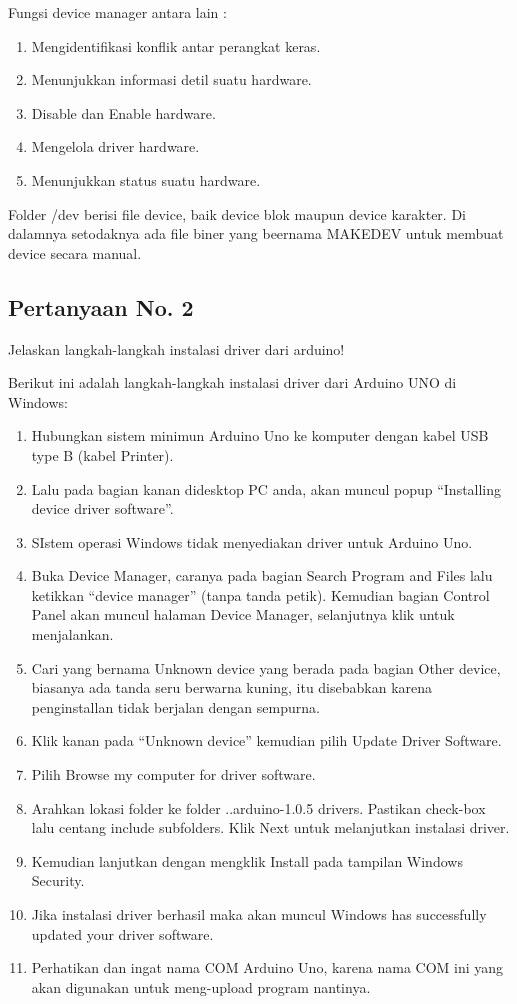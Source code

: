 \hfill \break
Fungsi device manager antara lain :
\begin{enumerate}
	\item Mengidentifikasi konflik antar perangkat keras.
	\item Menunjukkan informasi detil suatu hardware.
	\item Disable dan Enable hardware.
	\item Mengelola driver hardware.
	\item Menunjukkan status suatu hardware.
\end{enumerate}

\hfill \break
Folder /dev berisi file device, baik device blok maupun device karakter. Di dalamnya setodaknya ada file biner yang beernama MAKEDEV untuk membuat device secara manual.

\subsection{Pertanyaan No. 2}
Jelaskan langkah-langkah instalasi driver dari arduino!

\hfill \break
Berikut ini adalah langkah-langkah instalasi driver dari Arduino UNO di Windows:

\begin{enumerate}
	\item Hubungkan sistem minimun Arduino Uno ke komputer dengan kabel USB type B (kabel Printer).
	\item Lalu pada bagian kanan didesktop PC anda, akan muncul popup “Installing device driver software”.
	\item SIstem operasi Windows tidak menyediakan driver untuk Arduino Uno.
	\item Buka Device Manager, caranya pada bagian Search Program and Files lalu ketikkan “device manager” (tanpa tanda petik). Kemudian bagian Control Panel akan muncul halaman Device Manager, selanjutnya klik untuk menjalankan.
	\item Cari yang bernama Unknown device yang berada pada bagian Other device, biasanya ada tanda seru berwarna kuning, itu disebabkan karena penginstallan tidak berjalan dengan sempurna.
	\item Klik kanan pada “Unknown device” kemudian pilih Update Driver Software.
	\item Pilih Browse my computer for driver software.
	\item Arahkan lokasi folder ke folder ..arduino-1.0.5 drivers. Pastikan check-box lalu centang include subfolders. Klik Next untuk melanjutkan instalasi driver.
	\item Kemudian lanjutkan dengan mengklik Install pada tampilan Windows Security.
	\item Jika instalasi driver berhasil maka akan muncul Windows has successfully updated your driver software.
	\item Perhatikan dan ingat nama COM Arduino Uno, karena nama COM ini yang akan digunakan untuk meng-upload program nantinya.
\end{enumerate}

